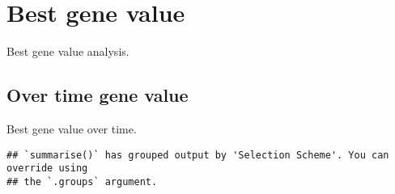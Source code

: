 \documentclass[]{book}
\newenvironment{Shaded}{\begin{snugshade}}{\end{snugshade}}
\newcommand{\CharTok}[1]{\textcolor[rgb]{0.31,0.60,0.02}{#1}}
\newcommand{\DataTypeTok}[1]{\textcolor[rgb]{0.13,0.29,0.53}{#1}}
\newcommand{\KeywordTok}[1]{\textcolor[rgb]{0.13,0.29,0.53}{\textbf{#1}}}
\newcommand{\NormalTok}[1]{#1}
\newcommand{\OperatorTok}[1]{\textcolor[rgb]{0.81,0.36,0.00}{\textbf{#1}}}
\newcommand{\StringTok}[1]{\textcolor[rgb]{0.31,0.60,0.02}{#1}}
\begin{document}
\hypertarget{best-gene-value}{%
\section{Best gene value}\label{best-gene-value}}

Best gene value analysis.

\hypertarget{over-time-gene-value}{%
\subsection{Over time gene value}\label{over-time-gene-value}}

Best gene value over time.

\begin{Shaded}
\end{Shaded}

\begin{verbatim}
## `summarise()` has grouped output by 'Selection Scheme'. You can override using
## the `.groups` argument.
\end{verbatim}
\end{document}
